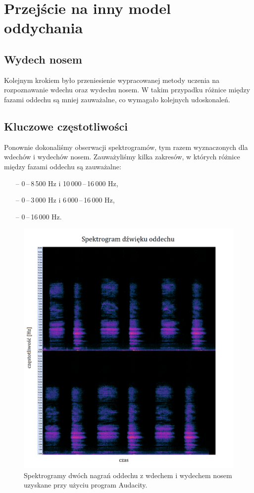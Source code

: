 \documentclass[polish]{article}
\begin{document}
\section{Przejście na inny model oddychania}
\subsection{Wydech nosem}
Kolejnym krokiem było przeniesienie wypracowanej metody uczenia na rozpoznawanie wdechu oraz wydechu nosem. W takim przypadku różnice między fazami oddechu są mniej zauważalne, co wymagało kolejnych udoskonaleń.
\subsection{Kluczowe częstotliwości}
Ponownie dokonaliśmy obserwacji spektrogramów, tym razem wyznaczonych dla wdechów i wydechów nosem. Zauważyliśmy kilka zakresów, w których różnice między fazami oddechu są zauważalne:
\begin{itemize}
	\setlength\itemsep{-0.25em}
	\item[--] 0\,--\,8\,500 \unit{Hz} i 10\,000\,--\,16\,000 \unit{Hz},
	\item[--] 0\,--\,3\,000 \unit{Hz} i 6\,000\,--\,16\,000 \unit{Hz},
	\item[--] 0\,--\,16\,000 \unit{Hz}.
\end{itemize}
\begin{figure}[H]
	\centering
	\includegraphics[width=13cm]{spektrogram_wydech_nosem}
	\caption{Spektrogramy dwóch nagrań oddechu z wdechem i wydechem nosem uzyskane przy użyciu program Audacity.}
\end{figure}
\end{document}
